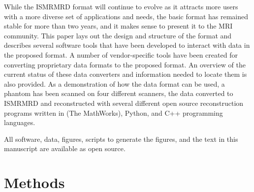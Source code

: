\documentclass[12pt, draft]{article}
\newcommand{\mreplaced}[2][None]{\replaced[remark=#1]{#2}}
\begin{document}
While the ISMRMRD format will continue to evolve as it attracts more users with a more diverse set of applications and needs, the basic format has remained stable for more than two years, and it makes sense to present it to the MRI community. This paper lays out the design and structure of the format and describes several software tools that have been developed to interact with data in the proposed format. A number of vendor-specific tools have been created for converting proprietary data formats to the proposed format. An overview of the current status of these data converters and information needed to locate them is also provided. As a demonstration of how the data format can be used, a phantom has been scanned on four different scanners, the data converted to ISMRMRD and reconstructed with several different open source reconstruction programs written in  \mreplaced[R2.14]{MATLAB}{Matlab} (The MathWorks), Python, and C++ programming languages. 

All software, data, figures, scripts to generate the figures, and the text in this manuscript are available as open source. 

\section*{Methods}
\end{document}
